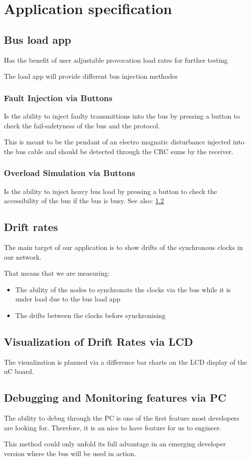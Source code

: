 \section{Application specification}

\subsection{Bus load app}
\label{app_specification:bus_load}
Has the benefit of user adjustable provocation load rates for 
further testing

The load app will provide different bus injection methodes
\subsubsection{Fault Injection via Buttons}
Is the ability to inject faulty transmittions into the bus by pressing
a button to check the fail-safetyness of the bus and the protocol.

This is meant to be the pendant of an electro magnatic disturbance
injected into the bus cable and should be detected through the
CRC sums by the receiver.

\subsubsection{Overload Simulation via Buttons}
Is the ability to inject heavy bus load by pressing a button to
check the accessibility of the bus if the bus is busy. 
See also: \ref{app_specification:drift_rates} 

\subsection{Drift rates}
\label{app_specification:drift_rates}
The main target of our application is to show drifts of the synchronous 
clocks in our network. 

That means that we are measuring:
\begin{itemize}
 \item The ability of the nodes to synchronate the clocks via the bus 
while it is under load due to the bus load app
 \item The drifts between the clocks before synchronising
\end{itemize}

\subsection{Visualization of Drift Rates via LCD}
The visualization is planned via a difference bar charts on the 
LCD display of the uC board.

\subsection{Debugging and Monitoring features via PC}
The ability to debug through the PC is one of the first 
feature most developers are looking for. Therefore, it is an
nice to have feature for us to engineer. 

This method could only unfold its full advantage in an emerging 
developer version where the bus will be used in action.
